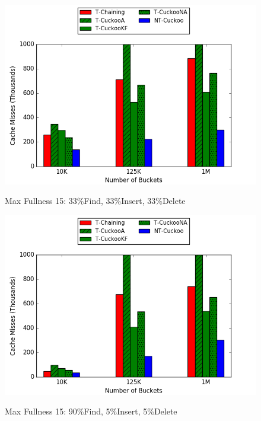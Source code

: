     \begin{figure}[H]
    \centering
        \begin{minipage}{0.75\textwidth}
        \centering
            {\includegraphics[width=\textwidth]{maps/3315cm.png}}
            \caption*{Max Fullness 15: 33\%Find, 33\%Insert, 33\%Delete}
            \vspace{20pt}
        \end{minipage}
        \begin{minipage}{0.75\textwidth}
            \centering
            {\includegraphics[width=\textwidth]{maps/9015cm.png}}
            \caption*{Max Fullness 15: 90\%Find, 5\%Insert, 5\%Delete}
        \end{minipage}
    \end{figure}


